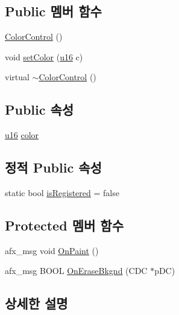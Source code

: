 \subsection*{Public 멤버 함수}
\begin{DoxyCompactItemize}
\item 
\mbox{\hyperlink{class_color_control_aa3a2f4bc5ea3e434a6a8698a0a9ec20b}{Color\+Control}} ()
\item 
void \mbox{\hyperlink{class_color_control_ad4f5b637e57ab4e7c4ed718e66e491eb}{set\+Color}} (\mbox{\hyperlink{_system_8h_a9e6c91d77e24643b888dbd1a1a590054}{u16}} c)
\item 
virtual \mbox{\hyperlink{class_color_control_a64019379e271bec02b8402c18ff7397f}{$\sim$\+Color\+Control}} ()
\end{DoxyCompactItemize}
\subsection*{Public 속성}
\begin{DoxyCompactItemize}
\item 
\mbox{\hyperlink{_system_8h_a9e6c91d77e24643b888dbd1a1a590054}{u16}} \mbox{\hyperlink{class_color_control_adda78267113753c247e7edcaae47f927}{color}}
\end{DoxyCompactItemize}
\subsection*{정적 Public 속성}
\begin{DoxyCompactItemize}
\item 
static bool \mbox{\hyperlink{class_color_control_a844b865ffc83cf76b50a3f7b0793619e}{is\+Registered}} = false
\end{DoxyCompactItemize}
\subsection*{Protected 멤버 함수}
\begin{DoxyCompactItemize}
\item 
afx\+\_\+msg void \mbox{\hyperlink{class_color_control_a63bcd96ef7044bf702632cab0fc41eba}{On\+Paint}} ()
\item 
afx\+\_\+msg B\+O\+OL \mbox{\hyperlink{class_color_control_a06b4b2fd6e06aab248c7e63859ea4f11}{On\+Erase\+Bkgnd}} (C\+DC $\ast$p\+DC)
\end{DoxyCompactItemize}


\subsection{상세한 설명}


